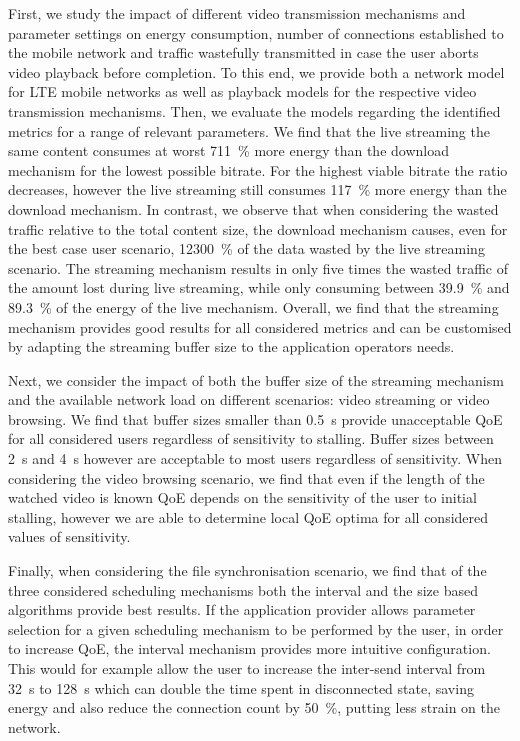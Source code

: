 First, we study the impact of different video transmission mechanisms and parameter settings on energy consumption, number of connections established to the mobile network and traffic wastefully transmitted in case the user aborts video playback before completion.
To this end, we provide both a network model for \gls{LTE} mobile networks as well as playback models for the respective video transmission mechanisms.
Then, we evaluate the models regarding the identified metrics for a range of relevant parameters.
We find that the live streaming the same content consumes at worst \SI{711}{\percent} more energy than the download mechanism for the lowest possible bitrate. For the highest viable bitrate the ratio decreases, however the live streaming still consumes \SI{117}{\percent} more energy than the download mechanism.
In contrast, we observe that when considering the wasted traffic relative to the total content size, the download mechanism causes, even for the best case user scenario, \SI{12300}{\percent} of the data wasted by the live streaming scenario.
The streaming mechanism results in only five times the wasted traffic of the amount lost during live streaming, while only consuming between \SI{39.9}{\percent} and \SI{89.3}{\percent} of the energy of the live mechanism.	
Overall, we find that the streaming mechanism provides good results for all considered metrics and can be customised by adapting the streaming buffer size to the application operators needs. 

Next, we consider the impact of both the buffer size of the streaming mechanism and the available network load on different scenarios: video streaming or video browsing.
We find that buffer sizes smaller than \SI{0.5}{\second} provide unacceptable \gls{QoE} for all considered users regardless of sensitivity to stalling.
Buffer sizes between \SI{2}{\second} and \SI{4}{\second} however are acceptable to most users regardless of sensitivity.
When considering the video browsing scenario, we find that even if the length of the watched video is known \gls{QoE} depends on the sensitivity of the user to initial stalling, however we are able to determine local \gls{QoE} optima for all considered values of sensitivity.

Finally, when considering the file synchronisation scenario, we find that of the three considered scheduling mechanisms both the interval and the size based algorithms provide best results.
If the application provider allows parameter selection for a given scheduling mechanism to be performed by the user, in order to increase \gls{QoE}, the interval mechanism provides more intuitive configuration.
This would for example allow the user to increase the inter-send interval from \SI{32}{\second} to \SI{128}{\second} which can double the time spent in disconnected state, saving energy and also reduce the connection count by \SI{50}{\percent}, putting less strain on the network.

